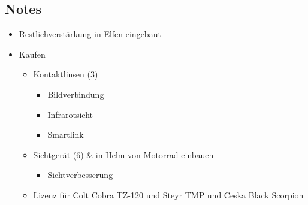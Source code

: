 {\begin{multicols}{2}
\section*{Notes}
\begin{itemize}
	\item Restlichverstärkung in Elfen eingebaut
	\item Kaufen
		\begin{itemize}
			\item Kontaktlinsen (3)
				\begin{itemize}	
					\item Bildverbindung
					\item Infrarotsicht
					\item Smartlink
				\end{itemize}
			\item Sichtgerät (6) \& in Helm von Motorrad einbauen
				\begin{itemize}
					\item Sichtverbesserung
				\end{itemize}
			\item Lizenz für Colt Cobra TZ-120 und Steyr TMP und Ceska Black Scorpion
		\end{itemize}
\end{itemize}
\end{multicols}

}
